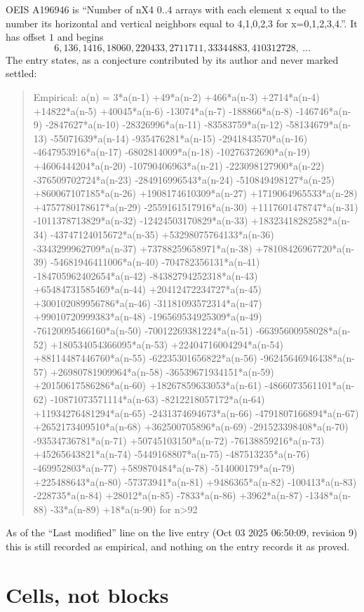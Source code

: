 \documentclass[11pt,a4paper]{article}
\theoremstyle{plain}
\theoremstyle{definition}
\begin{document}
OEIS A196946 is ``Number of nX4 0..4 arrays with each element x equal to the number its horizontal and vertical neighbors equal to 4,1,0,2,3 for x=0,1,2,3,4.''. It has offset $1$ and begins
\[
6, 136, 1416, 18060, 220433, 2711711, 33344883, 410312728,\ \dots
\]
The entry states, as a conjecture contributed by its author and never marked settled:
\begin{quote}
Empirical: a(n) = 3*a(n-1) +49*a(n-2) +466*a(n-3) +2714*a(n-4) +14822*a(n-5) +40045*a(n-6) -13074*a(n-7) -188866*a(n-8) -146746*a(n-9) -2847627*a(n-10) -28326996*a(n-11) -83583759*a(n-12) -58134679*a(n-13) -55071639*a(n-14) -935476281*a(n-15) -2941843570*a(n-16) -4647953916*a(n-17) -6802814009*a(n-18) -10276372690*a(n-19) +4606444204*a(n-20) -10790406963*a(n-21) -223098127900*a(n-22) -376509702724*a(n-23) -284916996543*a(n-24) -510849498127*a(n-25) +860067107185*a(n-26) +1908174610309*a(n-27) +1719064965533*a(n-28) +4757780178617*a(n-29) -2559161517916*a(n-30) +1117601478747*a(n-31) -1011378713829*a(n-32) -12424503170829*a(n-33) +18323418282582*a(n-34) -43747124015672*a(n-35) +53298075764133*a(n-36) -3343299962709*a(n-37) +73788259658971*a(n-38) +78108426967720*a(n-39) -54681946411006*a(n-40) -704782356131*a(n-41) -184705962402654*a(n-42) -84382794252318*a(n-43) +65484731585469*a(n-44) +20412472234727*a(n-45) +300102089956786*a(n-46) -31181093572314*a(n-47) +99010720999383*a(n-48) -196569534925309*a(n-49) -76120095466160*a(n-50) -70012269381224*a(n-51) -66395600958028*a(n-52) +180534054366095*a(n-53) +22404716004294*a(n-54) +88114487446760*a(n-55) -62235301656822*a(n-56) -96245646946438*a(n-57) +26980781909964*a(n-58) -36539671934151*a(n-59) +20150617586286*a(n-60) +18267859633053*a(n-61) -4866073561101*a(n-62) -10871073571114*a(n-63) -8212218057172*a(n-64) +11934276481294*a(n-65) -2431374694673*a(n-66) -4791807166894*a(n-67) +2652173409510*a(n-68) +362500705896*a(n-69) -291523398408*a(n-70) -93534736781*a(n-71) +50745103150*a(n-72) -76138859216*a(n-73) +45265643821*a(n-74) -5449168807*a(n-75) -487513235*a(n-76) -469952803*a(n-77) +589870484*a(n-78) -514000179*a(n-79) +225488643*a(n-80) -57373941*a(n-81) +9486365*a(n-82) -100413*a(n-83) -228735*a(n-84) +28012*a(n-85) -7833*a(n-86) +3962*a(n-87) -1348*a(n-88) -33*a(n-89) +18*a(n-90) for n>92
\end{quote}
As of the ``Last modified'' line on the live entry (Oct 03 2025 06:50:09, revision 9) this is still
recorded as empirical, and nothing on the entry records it as proved.

\section{Cells, not blocks}
\end{document}
